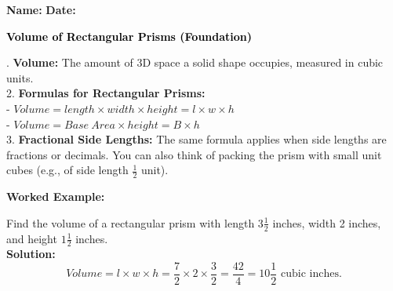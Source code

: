 \documentclass[12pt, letterpaper, fleqn]{article}
\begin{document}
\textbf{Name:} \underline{\hspace{5cm}}
\hfill
\textbf{Date:} \underline{\hspace{3cm}}\\

\begin{tcolorbox}[colback=customteal!20]
    \large\textcolor{black}{\textbf{Volume of Rectangular Prisms (Foundation)}}
\end{tcolorbox}

\vspace{3mm}

. \textbf{Volume:} The amount of 3D space a solid shape occupies, measured in cubic units. \\
2. \textbf{Formulas for Rectangular Prisms:} \\
- $Volume = length \times width \times height = l \times w \times h$ \\
- $Volume = Base \ Area \times height = B \times h$ \\
3. \textbf{Fractional Side Lengths:} The same formula applies when side lengths are fractions or decimals. You can also think of packing the prism with small unit cubes (e.g., of side length $\frac{1}{2}$ unit).

\vspace{4mm}

\begin{tcolorbox}[colback=white, colframe=black!25, boxrule=0.6pt, arc=4mm, left=6mm, right=6mm, top=5mm, bottom=5mm]
\textbf{Worked Example:}

\medskip
\noindent
Find the volume of a rectangular prism with length $3\frac{1}{2}$ inches, width 2 inches, and height $1\frac{1}{2}$ inches.\\
\textbf{Solution:} \\
$$Volume = l \times w \times h = \frac{7}{2} \times 2 \times \frac{3}{2} = \frac{42}{4} = 10\frac{1}{2}\text{ cubic inches.}$$
\end{tcolorbox}

\vspace{4mm}
\end{document}
